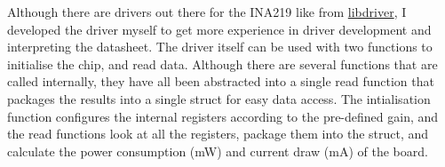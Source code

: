 Although there are drivers out there for the INA219 like from \href{https://github.com/libdriver/ina219}{libdriver}, I developed the driver myself to get more experience in driver development and interpreting the datasheet.
\nl
The driver itself can be used with two functions to initialise the chip, and read data. Although there are several functions that are called internally, they have all been abstracted into a single read function that packages the results into a single struct for easy data access. 
\nl
The intialisation function configures the internal registers according to the pre-defined gain, and the read functions look at all the registers, package them into the struct, and calculate the power consumption (mW) and current draw (mA) of the board.